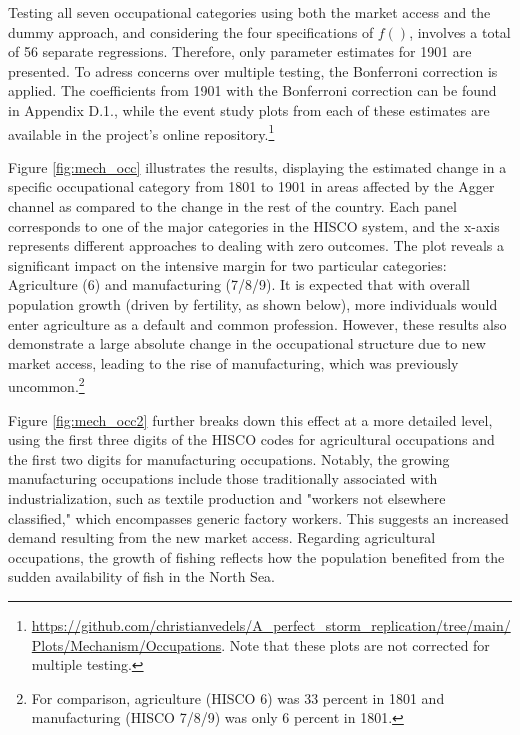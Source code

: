 \documentclass[11pt]{article}
\begin{document}
Testing all seven occupational categories using both the market access and the dummy approach, and considering the four specifications of $f()$, involves a total of 56 separate regressions. Therefore, only parameter estimates for 1901 are presented. To adress concerns over multiple testing, the Bonferroni correction is applied. The coefficients from 1901 with the Bonferroni correction can be found in Appendix D.1., while the event study plots from each of these estimates are available in the project's online repository.\footnote{
\url{https://github.com/christianvedels/A_perfect_storm_replication/tree/main/Plots/Mechanism/Occupations}. Note that these plots are not corrected for multiple testing. 
}

Figure \ref{fig:mech_occ} illustrates the results, displaying the estimated change in a specific occupational category from 1801 to 1901 in areas affected by the Agger channel as compared to the change in the rest of the country. Each panel corresponds to one of the major categories in the HISCO system, and the x-axis represents different approaches to dealing with zero outcomes. The plot reveals a significant impact on the intensive margin for two particular categories: Agriculture (6) and manufacturing (7/8/9).  It is expected that with overall population growth (driven by fertility, as shown below), more individuals would enter agriculture as a default and common profession. However, these results also demonstrate a large absolute change in the occupational structure due to new market access, leading to the rise of manufacturing, which was previously uncommon.\footnote{For comparison, agriculture (HISCO 6) was 33 percent in 1801 and manufacturing (HISCO 7/8/9) was only 6 percent in 1801.}

Figure \ref{fig:mech_occ2} further breaks down this effect at a more detailed level, using the first three digits of the HISCO codes for agricultural occupations and the first two digits for manufacturing occupations. Notably, the growing manufacturing occupations include those traditionally associated with industrialization, such as textile production and "workers not elsewhere classified," which encompasses generic factory workers. This suggests an increased demand resulting from the new market access. Regarding agricultural occupations, the growth of fishing reflects how the population benefited from the sudden availability of fish in the North Sea. 
\end{document}
